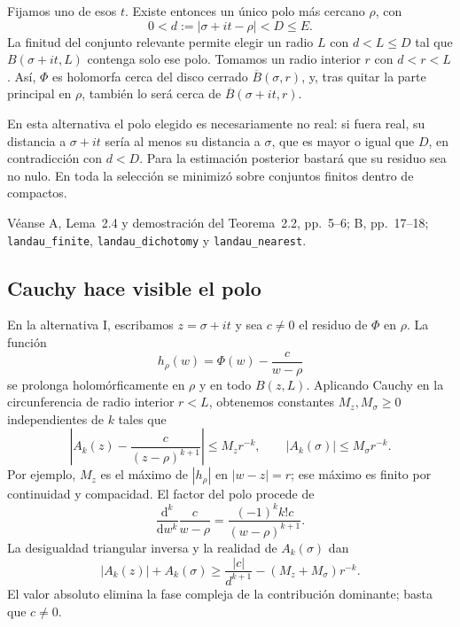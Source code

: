 Fijamos uno de esos $t$. Existe entonces un único polo más cercano
$\rho$, con
\[
 0<d:=|\sigma+it-\rho|<D\le E.
\]
La finitud del conjunto relevante permite elegir un radio $L$ con
$d<L\le D$ tal que $B(\sigma+it,L)$ contenga solo ese polo.
Tomamos un radio interior $r$ con $d<r<L$. Así, $\Phi$ es holomorfa
cerca del disco cerrado $\overline B(\sigma,r)$, y, tras quitar la
parte principal en $\rho$, también lo será cerca de
$\overline B(\sigma+it,r)$.

En esta alternativa el polo elegido es necesariamente no real: si fuera
real, su distancia a $\sigma+it$ sería al menos su distancia a $\sigma$,
que es mayor o igual que $D$, en contradicción con $d<D$.
Para la estimación posterior bastará que su residuo sea no nulo.
En toda la selección se minimizó sobre conjuntos finitos dentro de compactos.

{\raggedright
Véanse A, Lema~2.4 y demostración del Teorema~2.2, pp.~5--6;
B, pp.~17--18; \texttt{landau\_finite}, \texttt{landau\_dichotomy}
y \texttt{landau\_nearest}.
\par}

\subsection{Cauchy hace visible el polo}

En la alternativa I, escribamos $z=\sigma+it$ y sea $c\ne0$
el residuo de $\Phi$ en $\rho$. La función
\[
 h_\rho(w)=\Phi(w)-\frac c{w-\rho}
\]
se prolonga holomórficamente en $\rho$ y en todo $B(z,L)$.
Aplicando Cauchy en la circunferencia de radio interior $r<L$, obtenemos
constantes $M_z,M_\sigma\ge0$ independientes de $k$ tales que
\begin{equation}
 \left|A_k(z)-\frac c{(z-\rho)^{k+1}}\right|\le M_zr^{-k},
 \qquad |A_k(\sigma)|\le M_\sigma r^{-k}.
 \label{vent-cauchy}
\end{equation}
Por ejemplo, $M_z$ es el máximo de $|h_\rho|$ en $|w-z|=r$;
ese máximo es finito por continuidad y compacidad.
El factor del polo procede de
\[
 \frac{\mathrm d^k}{\mathrm dw^k}\frac c{w-\rho}
 =\frac{(-1)^kk!c}{(w-\rho)^{k+1}}.
\]
La desigualdad triangular inversa y la realidad de $A_k(\sigma)$ dan
\begin{equation}
 |A_k(z)|+A_k(\sigma)
 \ge\frac{|c|}{d^{k+1}}-(M_z+M_\sigma)r^{-k}.
 \label{vent-cota-polo}
\end{equation}
El valor absoluto elimina la fase compleja de la contribución dominante;
basta que $c\ne0$.

